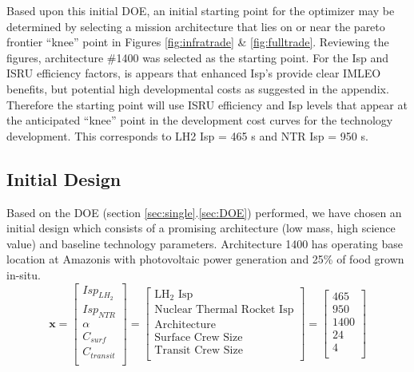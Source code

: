 \documentclass[]{aiaa-pretty}
\begin{document}
Based upon this initial DOE, an initial starting point for the optimizer may be determined by selecting a mission architecture that lies on or near the pareto frontier “knee” point in Figures \ref{fig:infratrade} \& \ref{fig:fulltrade}. Reviewing the figures, architecture \#1400 was selected as the starting point. For the Isp and ISRU efficiency factors, is appears that enhanced Isp’s provide clear IMLEO benefits, but potential high developmental costs as suggested in the appendix. Therefore the starting point will use ISRU efficiency and Isp levels that appear at the anticipated “knee” point in the development cost curves for the technology development. This corresponds to LH2 Isp = 465 s and NTR Isp = 950 s.

\subsection{Initial Design}
Based on the DOE (section \ref{sec:single}.\ref{sec:DOE}) performed, we have chosen an initial design which consists of a promising architecture (low mass, high science value) and baseline technology parameters. Architecture 1400 has operating base location at Amazonis with photovoltaic power generation and 25\% of food grown in-situ.
\begin{equation*}
\mathbf{x}=
\begin{bmatrix}
Isp_{LH_2}\\
Isp_{NTR}\\
\alpha\\
C_{surf}\\
C_{transit}\\
\end{bmatrix}
=
\begin{bmatrix}
\mbox{LH}_2\mbox{ Isp}\\
\mbox{Nuclear Thermal Rocket Isp}\\
\mbox{Architecture}\\
\mbox{Surface Crew Size}\\
\mbox{Transit Crew Size}\\
\end{bmatrix}
=
\begin{bmatrix}
465\\
950\\
1400\\
24\\
4\\
\end{bmatrix}
\end{equation*}
\end{document}
